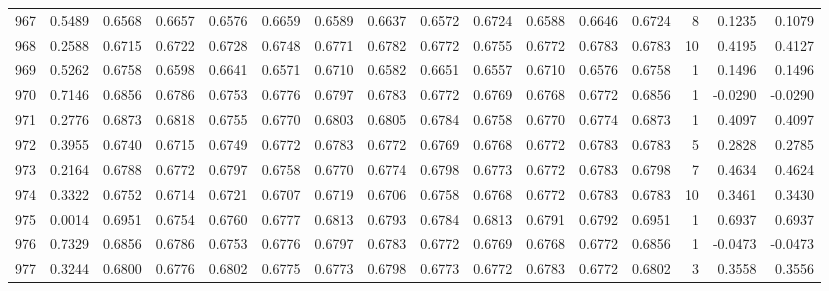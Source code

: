 \begin{tabular}{lrrrrrrrrrrrrrrr}
967 &      0.5489 &  0.6568 &  0.6657 &  0.6576 &  0.6659 &  0.6589 &  0.6637 &  0.6572 &  0.6724 &  0.6588 &   0.6646 &     0.6724 &      8 &                    0.1235 &                     0.1079 \\
968 &      0.2588 &  0.6715 &  0.6722 &  0.6728 &  0.6748 &  0.6771 &  0.6782 &  0.6772 &  0.6755 &  0.6772 &   0.6783 &     0.6783 &     10 &                    0.4195 &                     0.4127 \\
969 &      0.5262 &  0.6758 &  0.6598 &  0.6641 &  0.6571 &  0.6710 &  0.6582 &  0.6651 &  0.6557 &  0.6710 &   0.6576 &     0.6758 &      1 &                    0.1496 &                     0.1496 \\
970 &      0.7146 &  0.6856 &  0.6786 &  0.6753 &  0.6776 &  0.6797 &  0.6783 &  0.6772 &  0.6769 &  0.6768 &   0.6772 &     0.6856 &      1 &                   -0.0290 &                    -0.0290 \\
971 &      0.2776 &  0.6873 &  0.6818 &  0.6755 &  0.6770 &  0.6803 &  0.6805 &  0.6784 &  0.6758 &  0.6770 &   0.6774 &     0.6873 &      1 &                    0.4097 &                     0.4097 \\
972 &      0.3955 &  0.6740 &  0.6715 &  0.6749 &  0.6772 &  0.6783 &  0.6772 &  0.6769 &  0.6768 &  0.6772 &   0.6783 &     0.6783 &      5 &                    0.2828 &                     0.2785 \\
973 &      0.2164 &  0.6788 &  0.6772 &  0.6797 &  0.6758 &  0.6770 &  0.6774 &  0.6798 &  0.6773 &  0.6772 &   0.6783 &     0.6798 &      7 &                    0.4634 &                     0.4624 \\
974 &      0.3322 &  0.6752 &  0.6714 &  0.6721 &  0.6707 &  0.6719 &  0.6706 &  0.6758 &  0.6768 &  0.6772 &   0.6783 &     0.6783 &     10 &                    0.3461 &                     0.3430 \\
975 &      0.0014 &  0.6951 &  0.6754 &  0.6760 &  0.6777 &  0.6813 &  0.6793 &  0.6784 &  0.6813 &  0.6791 &   0.6792 &     0.6951 &      1 &                    0.6937 &                     0.6937 \\
976 &      0.7329 &  0.6856 &  0.6786 &  0.6753 &  0.6776 &  0.6797 &  0.6783 &  0.6772 &  0.6769 &  0.6768 &   0.6772 &     0.6856 &      1 &                   -0.0473 &                    -0.0473 \\
977 &      0.3244 &  0.6800 &  0.6776 &  0.6802 &  0.6775 &  0.6773 &  0.6798 &  0.6773 &  0.6772 &  0.6783 &   0.6772 &     0.6802 &      3 &                    0.3558 &                     0.3556 \\

\end{tabular}
